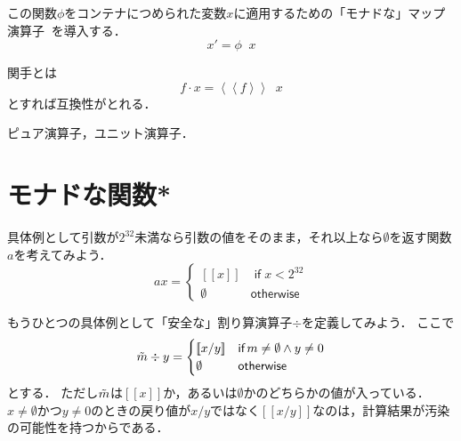 \documentclass[a4paper,draft]{jsbook}
\def\[{\left[\!\left[}
\def\]{\right]\!\right]}
\newcommand{\mathMaybeVar}[1]{\Tilde{#1}}
\newcommand{\mathMaybeWith}[1]{\[#1\]}
\newcommand{\mathUnitWith}[1]{\left\langle\!\left\langle#1\right\rangle\!\right\rangle}
\newcommand{\mathNothing}{\emptyset}
\newcommand{\mathAnd}{\mathbin{\wedge}}
\newcommand{\mathGeneralMap}{\mathbin{\cdot}}
\newcommand{\mathKeyword}[1]{\operatorname{\textsf{#1}}}
\newcommand{\mathIf}{\mathKeyword{if}}
\newcommand{\mathOtherwise}{\mathKeyword{otherwise}}
\DeclareMathOperator{\hsklMonadMap}{{DO NOT USE}--\heartsuit}
\begin{document}
この関数$\phi$をコンテナにつめられた変数$x$に適用するための「モナドな」マップ演算子$\hsklMonadMap$を導入する．
$$x'=\phi\hsklMonadMap x$$

関手とは
$$f\mathGeneralMap x=\mathUnitWith{f}\hsklMonadMap x$$
とすれば互換性がとれる．


ピュア演算子，ユニット演算子．


\section{モナドな関数*}


具体例として引数が$2^{32}$未満なら引数の値をそのまま，それ以上なら$\mathNothing$を返す関数$a$を考えてみよう．
\begin{equation}
ax=\begin{cases}
\mathMaybeWith{x}&\mathIf x<2^{32}\\
\mathNothing&\mathOtherwise
\end{cases}
\end{equation}


もうひとつの具体例として「安全な」割り算演算子$\div$を定義してみよう．
ここで
\begin{equation}
\mathMaybeVar{m}\div y=\begin{cases}\mathMaybeWith{x/y}&\mathIf m\neq\mathNothing\mathAnd y\neq0\\
\mathNothing&\mathOtherwise\end{cases}
\end{equation}
とする．
ただし$\mathMaybeVar{m}$は$\mathMaybeWith{x}$か，あるいは$\mathNothing$かのどちらかの値が入っている．
$x\neq\mathNothing$かつ$y\neq0$のときの戻り値が$x/y$ではなく$\mathMaybeWith{x/y}$なのは，計算結果が汚染の可能性を持つからである．
\end{document}
